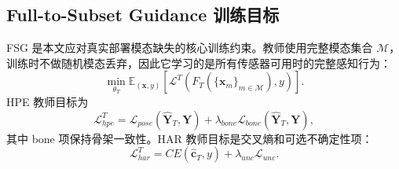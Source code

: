 ﻿\documentclass[UTF8,twocolumn]{ctexart}
\begin{document}
\subsection{Full-to-Subset Guidance 训练目标}
FSG 是本文应对真实部署模态缺失的核心训练约束。教师使用完整模态集合 $\mathcal{M}$，训练时不做随机模态丢弃，因此它学习的是所有传感器可用时的完整感知行为：
\begin{equation}
    \min_{\theta_T}\mathbb{E}_{(\mathbf{x},y)}
    \left[
    \mathcal{L}^{T}(F_T(\{\mathbf{x}_m\}_{m\in\mathcal{M}}),y)
    \right].
\end{equation}
HPE 教师目标为
\begin{equation}
    \mathcal{L}^{T}_{hpe}
    =
    \mathcal{L}_{pose}(\hat{\mathbf{Y}}_T,\mathbf{Y})
    +
    \lambda_{bone}\mathcal{L}_{bone}(\hat{\mathbf{Y}}_T,\mathbf{Y}),
\end{equation}
其中 bone 项保持骨架一致性。HAR 教师目标是交叉熵和可选不确定性项：
\begin{equation}
    \mathcal{L}^{T}_{har}
    =
    CE(\hat{\mathbf{c}}_T,y)+\lambda_{unc}\mathcal{L}_{unc}.
\end{equation}
\end{document}
